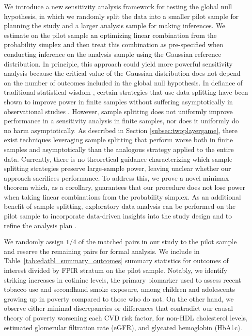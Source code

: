 \documentclass[12pt,leqno,titlepage]{amsart}
\newcommand{\1}{\mathbbm{1}}
\begin{document}
\begin{bibunit}
We introduce a new sensitivity analysis framework for testing the global null hypothesis, in which we randomly split the data into a smaller pilot sample for planning the study and a larger analysis sample for making inferences. We estimate on the pilot sample an optimizing linear combination from the probability simplex and then treat this combination as pre-specified when conducting inference on the analysis sample using the Gaussian reference distribution. In principle, this approach could yield more powerful sensitivity analysis because the critical value of the Gaussian distribution does not depend on the number of outcomes included in the global null hypothesis. In defiance of traditional statistical wisdom \citep{cox1975note,wasserman2006weighted}, certain strategies that use data splitting have been shown to improve power in finite samples without suffering asymptotically in observational studies \citep{heller2009split,bekerman2026planning}. However, sample splitting does not uniformly improve performance in a sensitivity analysis in finite samples, nor does it uniformly do no harm asymptotically. As described in Section \ref{subsec:twoplayergame}, there exist techniques leveraging sample splitting that perform worse both in finite samples and asymptotically than the analogous strategy applied to the entire data. 
Currently, there is no theoretical guidance characterizing which sample splitting strategies preserve large-sample power, leaving unclear whether our approach sacrifices performance. 
To address this, we prove a novel minimax theorem which, as a corollary, guarantees that our procedure does not lose power when taking linear combinations from the probability simplex. As an additional benefit of sample splitting, exploratory data analysis can be performed on the pilot sample to incorporate data-driven insights into the study design and to refine the analysis plan \citep{rosenbaum2010design, small2024protocols}.

We randomly assign $1/4$ of the matched pairs in our study to the pilot sample and reserve the remaining pairs for formal analysis. We include in Table~\ref{tab:edatbl_summary_outcomes} summary statistics for outcomes of interest divided by FPIR stratum on the pilot sample.
Notably, we identify striking increases in cotinine levels, the primary biomarker used to assess recent tobacco use and secondhand smoke exposure, among children and adolescents growing up in poverty compared to those who do not. On the other hand, we observe either minimal discrepancies or differences that contradict our causal theory of poverty worsening each CVD risk factor, for non-HDL cholesterol levels, estimated glomerular filtration rate (eGFR), and glycated hemoglobin (HbA1c).


\end{bibunit}
\end{document}

